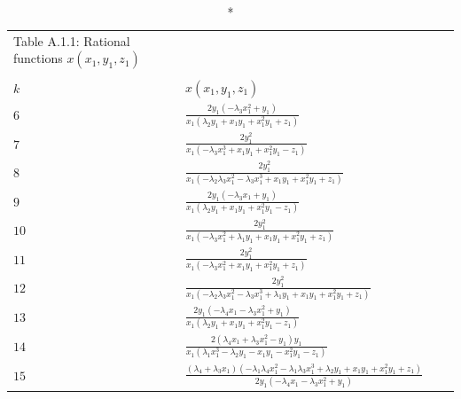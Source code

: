 \documentclass[10pt]{article}
\begin{document}
{\small
\begin{longtable}{llll}
\caption*{Table A.1.1: Rational functions  $ x(x_1,y_1,z_1)$ }
 \vspace{-5.5mm}\\
 \\
\hline
  $k$ &  $x(x_1,y_1,z_1) $     
    \\
  \hline
  \endhead
\vspace{1mm}$6$ &
 $\frac{2 y_1 (-\lambda_3 x_1^2 + y_1)}{x_1 (\lambda_2 y_1 + x_1 y_1 + x_1^2 y_1 + z_1)}$ 
  \\
\vspace{1mm}$7$ &
 $\frac{2 y_1^2}{x_1 (-\lambda_3 x_1^3 + x_1 y_1 + x_1^2 y_1 - z_1)}$  \\
\vspace{1mm}$8$ &
 $\frac{2 y_1^2}{x_1 (-\lambda_2 \lambda_3 x_1^2 - \lambda_3 x_1^3 + x_1 y_1 + x_1^2 y_1 + z_1)}$  \\
\vspace{1mm}$9$ &
 $\frac{2 y_1 (-\lambda_3 x_1 + y_1)}{x_1 (\lambda_2 y_1 + x_1 y_1 + x_1^2 y_1 - z_1)}$ \\
\vspace{1mm}$10$ &
 $\frac{2 y_1^2}{x_1 (-\lambda_3 x_1^2  + \lambda_1 y_1 + x_1 y_1 + x_1^2 y_1+z_1)}$ 
  \\
\vspace{1mm}$11$ &
 $\frac{2 y_1^2}{x_1 (-\lambda_3 x_1^2 + x_1 y_1 + x_1^2 y_1 + z_1)}$ 
 \\
\vspace{1mm}$12$ &
 $\frac{2 y_1^2}{x_1 (-\lambda_2 \lambda_3 x_1^2 - \lambda_3 x_1^3 + \lambda_1 y_1 + x_1 y_1 + x_1^2 y_1 + z_1)}$ 
 \\
\vspace{1mm}$13$ & $\frac{2 y_1 (-\lambda_4 x_1 - \lambda_3 x_1^2 + y_1)}{x_1 (\lambda_2 y_1 + x_1 y_1 + x_1^2 y_1 - z_1)}$
\\
\vspace{1mm}$14$ & $\frac{2 (\lambda_4 x_1 + \lambda_3 x_1^2 - y_1) y_1}{x_1 (\lambda_1 x_1^3 - \lambda_2 y_1 - x_1 y_1 - x_1^2 y_1 -
    z_1)}$ 
  \\
\vspace{1mm}$15$ &
 $\frac{(\lambda_4 + \lambda_3 x_1)( -\lambda_1 \lambda_4 x_1^2 - \lambda_1 \lambda_3 x_1^3 + \lambda_2 y_1 + x_1 y_1 + x_1^2 y_1 + z_1)}{2 y_1 (-\lambda_4 x_1 - \lambda_3 x_1^2 + y_1)}$ 

\end{longtable}}
\end{document}
